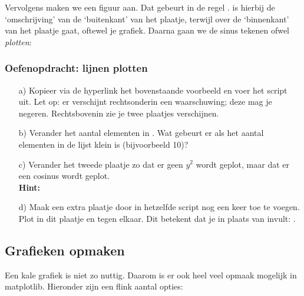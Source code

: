 \documentclass[a4paper,11pt, fleqn]{article}
\begin{document}
Vervolgens maken we een figuur aan. Dat gebeurt in de regel .  is hierbij de `omschrijving' van de `buitenkant' van het plaatje, terwijl  over de `binnenkant' van het plaatje gaat, oftewel je grafiek. Daarna gaan we de sinus tekenen ofwel {\it plotten}:


\subsubsection*{Oefenopdracht: lijnen plotten}
\begin{itemize}
	\item[a)] Kopieer via de hyperlink het bovenstaande voorbeeld en voer het script uit. Let op: er verschijnt rechtsonderin een waarschuwing; deze mag je negeren. Rechtsbovenin zie je twee plaatjes verschijnen.
	
	\item[b)] Verander het aantal elementen in . Wat gebeurt er als het aantal elementen in de lijst klein is (bijvoorbeeld 10)?

	\item[c)] Verander het tweede plaatje zo dat er geen $y^2$ wordt geplot, maar dat er een cosinus wordt geplot. \\
	{\bf Hint:} 

	\item[d)] Maak een extra plaatje door in hetzelfde script nog een keer  toe te voegen. Plot in dit plaatje  en  tegen elkaar. Dit betekent dat je in plaats van  invult: .
\end{itemize}

\subsection{Grafieken opmaken}
Een kale grafiek is niet zo nuttig. Daarom is er ook heel veel opmaak mogelijk in matplotlib. Hieronder zijn een flink aantal opties:
\end{document}
